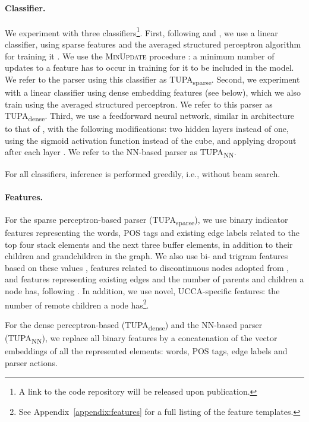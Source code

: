 \documentclass[11pt,a4paper]{article}
\newcommand{\parser}[1]{TUPA\textsubscript{#1}}
\begin{document}
\paragraph{Classifier.}
We experiment with three classifiers\footnote{A link to the code repository will
be released upon publication.}.
First, following \citet{maier2015discontinuous} and \citet{maier-lichte:2016:DiscoNLP},
we use a linear classifier, using sparse features and
the averaged structured perceptron algorithm for training it
\cite{Coll:04}. We use the \textsc{MinUpdate} procedure \cite{goldberg2011learning}:
a minimum number of updates to a feature has to occur in training for it
to be included in the model.
We refer to the parser using this classifier as \parser{sparse}.
Second, we experiment with a linear classifier using dense embedding features (see below),
which we also train using the averaged structured perceptron.
We refer to this parser as \parser{dense}.
Third, we use a feedforward neural network, similar in architecture to that of \citet{chen2014fast}, with the following modifications: two hidden layers instead of one, using the sigmoid activation function instead of the cube,
and applying dropout after each layer \cite{srivastava2014dropout}.
We refer to the NN-based parser as \parser{NN}.

For all classifiers, inference is performed greedily, i.e., without beam search.

\paragraph{Features.}
For the sparse perceptron-based parser (\parser{sparse}),
we use binary indicator features representing
the words, POS tags and existing edge labels related to the top four stack elements and the next
three buffer elements, in addition to their children and grandchildren in the graph.
We also use bi- and trigram features based on these values \cite{zhang2009transition,zhu2013fast},
features related to discontinuous nodes adopted from \citet{maier2015discontinuous},
and features representing existing edges and the number of parents and children a node has, following \citet{tokgoz2015transition}.
In addition, we use novel, UCCA-specific features:
the number of remote children a node has\footnote{See
Appendix~\ref{appendix:features} for a full listing of the feature templates.}.

For the dense perceptron-based (\parser{dense}) and the NN-based parser (\parser{NN}),
we replace all binary features by a
concatenation of the vector embeddings of all the represented elements:
words, POS tags, edge labels and parser actions.
\end{document}
